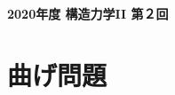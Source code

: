 \documentclass[10pt,a4j]{jarticle}
\newlength{\minitwocolumn}
\begin{document}
\newcommand{\fat}[1]{\mbox{\boldmath $#1$}}
\newcommand{\D}{\partial}
\newcommand{\w}{\omega}
\newcommand{\ga}{\alpha}
\newcommand{\gb}{\beta}
\newcommand{\gx}{\xi}
\newcommand{\gz}{\zeta}
\newcommand{\vhat}[1]{\hat{\fat{#1}}}
\newcommand{\spc}{\vspace{0.7\baselineskip}}
\newcommand{\halfspc}{\vspace{0.3\baselineskip}}

\newcommand{\twofig}[2]
 {
   \begin{figure}
     \begin{minipage}[t]{\minitwocolumn}
         \begin{center}   #1
         \end{center}
     \end{minipage}
         \hspace{\columnsep}
     \begin{minipage}[t]{\minitwocolumn}
         \begin{center} #2
         \end{center}
     \end{minipage}
   \end{figure}
 }
\begin{center}
	{\Large \bf 2020年度 構造力学II 第２回} \\
\end{center}
\section{曲げ問題}
\end{document}
